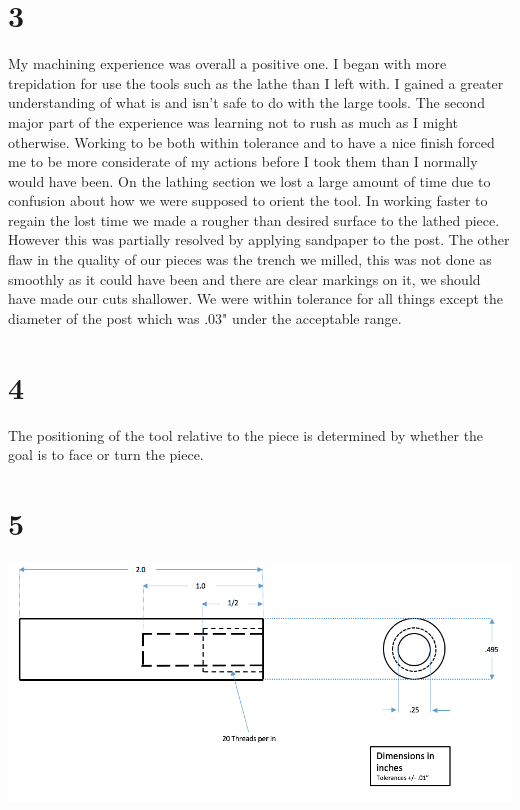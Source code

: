 \documentclass[11pt,letterpaper]{article}
\begin{document}
\section*{3} %
My machining experience was overall a positive one. I began with more trepidation for use the tools such as the lathe than I left with. I gained a greater understanding of what is and isn't safe to do with the large tools. The second major part of the experience was learning not to rush as much as I might otherwise. Working to be both within tolerance and to have a nice finish forced me to be more considerate of my actions before I took them than I normally would have been. On the lathing section we lost a large amount of time due to confusion about how we were supposed to orient the tool. In working faster to regain the lost time we made a rougher than desired surface to the lathed piece. However this was partially resolved by applying sandpaper to the post. The other flaw in the quality of our pieces was the trench we milled, this was not done as smoothly as it could have been and there are clear markings on it, we should have made our cuts shallower. We were within tolerance for all things except the diameter of the post which was .03" under the acceptable range.
\section*{4} %
The positioning of the tool relative to the piece is determined by whether the goal is to face or turn the piece. 
\section*{5} %
\includegraphics[width=\textwidth]{techDrawing.png}
\end{document}
